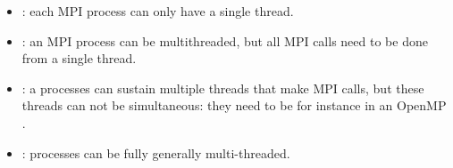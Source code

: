 \begin{itemize}
\item {}: each MPI process can only have
  a single thread.
\item {}: an MPI process can be
  multithreaded, but all MPI calls need to be done from a single
  thread.
\item {}: a processes can sustain
  multiple threads that make MPI calls, but these threads can not be
  simultaneous: they need to be for instance in an OpenMP
  .
\item {}: processes can be fully
  generally multi-threaded.
\end{itemize}
